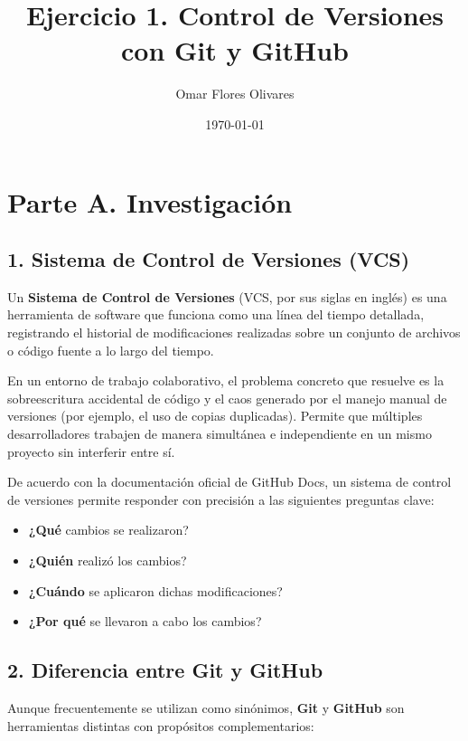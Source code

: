 \documentclass[12pt,letterpaper]{article}
\title{\textbf{Ejercicio 1. Control de Versiones con Git y GitHub}}
\author{Omar Flores Olivares}
\date{\today}
\begin{document}
\maketitle

\section*{Parte A. Investigación}

\subsection*{1. Sistema de Control de Versiones (VCS)}
Un \textbf{Sistema de Control de Versiones} (VCS, por sus siglas en inglés) es una herramienta de software que funciona como una línea del tiempo detallada, registrando el historial de modificaciones realizadas sobre un conjunto de archivos o código fuente a lo largo del tiempo. 

En un entorno de trabajo colaborativo, el problema concreto que resuelve es la sobreescritura accidental de código y el caos generado por el manejo manual de versiones (por ejemplo, el uso de copias duplicadas). Permite que múltiples desarrolladores trabajen de manera simultánea e independiente en un mismo proyecto sin interferir entre sí. 

De acuerdo con la documentación oficial de GitHub Docs, un sistema de control de versiones permite responder con precisión a las siguientes preguntas clave:
\begin{itemize}
    \item \textbf{¿Qué} cambios se realizaron?
    \item \textbf{¿Quién} realizó los cambios?
    \item \textbf{¿Cuándo} se aplicaron dichas modificaciones?
    \item \textbf{¿Por qué} se llevaron a cabo los cambios?
\end{itemize}


\subsection*{2. Diferencia entre Git y GitHub}
Aunque frecuentemente se utilizan como sinónimos, \textbf{Git} y \textbf{GitHub} son herramientas distintas con propósitos complementarios:
\end{document}
